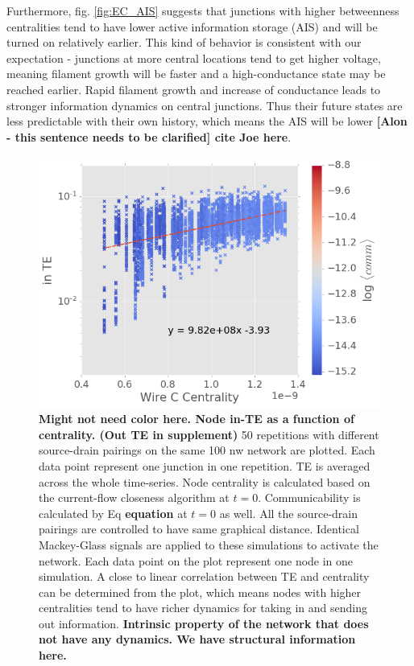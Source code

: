 \documentclass[%
 reprint,
 amsmath,amssymb,
 aps,
floatfix,
]{revtex4-2}
\begin{document}
Furthermore, fig. \ref{fig:EC_AIS} suggests that junctions with higher betweenness centralities tend to have lower active information storage (AIS) and will be turned on relatively earlier. This kind of behavior is consistent with our expectation - junctions at more central locations tend to get higher voltage, meaning filament growth will be faster and a high-conductance state may be reached earlier. Rapid filament growth and increase of conductance leads to stronger information dynamics on central junctions. Thus their future states are less predictable with their own history, which means the AIS will be lower \textbf{[Alon - this sentence needs to be clarified] cite Joe here}.

\begin{figure}[h]
	\centering
	\includegraphics[width=1\linewidth]{figure/in_TE}
	\caption{\textbf{Might not need color here. Node in-TE as a function of centrality. (Out TE in  supplement)} 50 repetitions with different source-drain pairings on the same 100 nw network are plotted. Each data point represent one junction in one repetition. TE is averaged across the whole time-series. Node centrality is calculated based on the current-flow closeness algorithm at $t = 0$. Communicability is calculated by Eq \textbf{equation} at $t = 0$ as well. All the source-drain pairings are controlled to have same graphical distance. Identical Mackey-Glass signals are applied to these simulations to activate the network. Each data point on the plot represent one node in one simulation. A close to linear correlation between TE and centrality can be determined from the plot, which means nodes with higher centralities tend to have richer dynamics for taking in and sending out information.
	\textbf{Intrinsic property of the network that does not have any dynamics. We have structural information here.}}
	\label{fig:in_te}
\end{figure}
\end{document}
